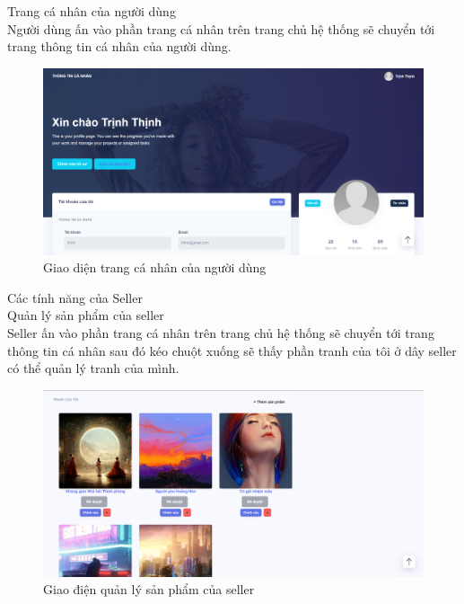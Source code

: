 \documentclass{article}
\begin{document}
{{{{{{{{{{{{{{{{{\begin{center}
\begin{figure}[htp]
		\end{figure}
	\end{center}
}

\newpage
{\large  
	\indent Trang cá nhân của người dùng \\
	{\large
		Người dùng ấn vào phần trang cá nhân trên trang chủ hệ thống sẽ chuyển tới trang thông tin cá nhân của người dùng.}
	\begin{center}
		\begin{figure}[htp]
			\begin{center}
				\includegraphics[scale=.400]{anh49.png}
			\end{center}
			\caption{Giao diện trang cá nhân của người dùng}
			
		\end{figure}
	\end{center}
}

\newpage
{\large Các tính năng của Seller\\
	\indent	Quản lý sản phẩm của seller \\
		{\large
		Seller ấn vào phần trang cá nhân trên trang chủ hệ thống sẽ chuyển tới trang thông tin cá nhân sau đó kéo chuột xuống sẽ thấy phần tranh của tôi ở dây seller có thể quản lý tranh của mình.}
	\begin{center}
		\begin{figure}[htp]
			\begin{center}
				\includegraphics[scale=.400]{anh39.png}
			\end{center}
			\caption{Giao điện quản lý sản phẩm của seller  }
			

\end{figure}
\end{center}}}}}}}}}}}}}}}}}}
\end{document}

